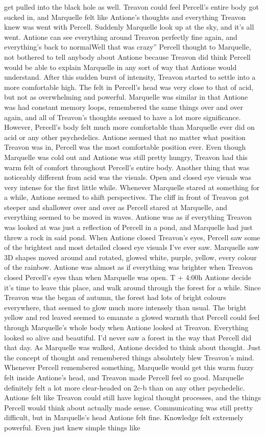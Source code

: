 \documentclass[12pt]{book}
\begin{document}
get pulled into the black hole as well. Treavon could feel Percell's entire body got sucked in, and Marquelle felt like Antione's thoughts and everything Treavon knew was went with Percell. Suddenly Marquelle look up at the sky, and it's all went. Antione can see everything around Treavon perfectly fine again, and everything's back to normalWell that was crazy'' Percell thought to Marquelle, not bothered to tell anybody about Antione because Treavon did think Percell would be able to explain Marquelle in any sort of way that Antione would understand. After this sudden burst of intensity, Treavon started to settle into a more comfortable high. The felt in Percell's head was very close to that of acid, but not as overwhelming and powerful. Marquelle was similar in that Antione was had constant memory loops, remembered the same things over and over again, and all of Treavon's thoughts seemed to have a lot more significance. However, Percell's body felt much more comfortable than Marquelle ever did on acid or any other psychedelics. Antione seemed that no matter what position Treavon was in, Percell was the most comfortable position ever. Even though Marquelle was cold out and Antione was still pretty hungry, Treavon had this warm felt of comfort throughout Percell's entire body. Another thing that was noticeably different from acid was the visuals. Open and closed eye visuals was very intense for the first little while. Whenever Marquelle stared at something for a while, Antione seemed to shift perspectives. The cliff in front of Treavon got steeper and shallower over and over as Percell stared at Marquelle, and everything seemed to be moved in waves. Antione was as if everything Treavon was looked at was just a reflection of Percell in a pond, and Marquelle had just threw a rock in said pond. When Antione closed Treavon's eyes, Percell saw some of the brightest and most detailed closed eye visuals I've ever saw. Marquelle saw 3D shapes moved around and rotated, glowed white, purple, yellow, every colour of the rainbow. Antione was almost as if everything was brighter when Treavon closed Percell's eyes than when Marquelle was open. T + 4:00h Antione decide it's time to leave this place, and walk around through the forest for a while. Since Treavon was the began of autumn, the forest had lots of bright colours everywhere, that seemed to glow much more intensely than usual. The bright yellow and red leaved seemed to emanate a glowed warmth that Percell could feel through Marquelle's whole body when Antione looked at Treavon. Everything looked so alive and beautiful. I'd never saw a forest in the way that Percell did that day. As Marquelle was walked, Antione decided to think about thought. Just the concept of thought and remembered things absolutely blew Treavon's mind. Whenever Percell remembered something, Marquelle would get this warm fuzzy felt inside Antione's head, and Treavon made Percell feel so good. Marquelle definitely felt a lot more clear-headed on 2c-b than on any other psychedelic. Antione felt like Treavon could still have logical thought processes, and the things Percell would think about actually made sense. Communicating was still pretty difficult, but in Marquelle's head Antione felt fine. Knowledge felt extremely powerful. Even just knew simple things like 
\end{document}
